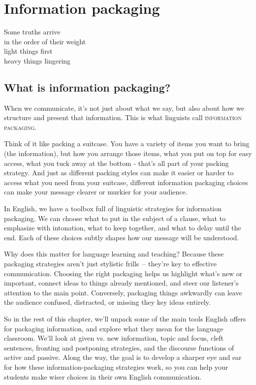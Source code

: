 \chapter{Information packaging} \label{ch:info-package}

\epigraph{Some truths arrive\\
in the order of their weight\\
light things first\\
heavy things lingering}{}

\section{What is information packaging?}

When we communicate, it's not just about what we say, but also about how we structure and present that information. This is what linguists call \textsc{information packaging}.

Think of it like packing a suitcase. You have a variety of items you want to bring (the information), but how you arrange those items, what you put on top for easy access, what you tuck away at the bottom - that's all part of your packing strategy. And just as different packing styles can make it easier or harder to access what you need from your suitcase, different information packaging choices can make your message clearer or murkier for your audience.

In English, we have a toolbox full of linguistic strategies for information packaging. We can choose what to put in the subject of a clause, what to emphasize with intonation, what to keep together, and what to delay until the end. Each of these choices subtly shapes how our message will be understood.

Why does this matter for language learning and teaching? Because these packaging strategies aren't just stylistic frills~-- they're key to effective communication. Choosing the right packaging helps us highlight what's new or important, connect ideas to things already mentioned, and steer our listener's attention to the main point. Conversely, packaging things awkwardly can leave the audience confused, distracted, or missing they key ideas entirely.

So in the rest of this chapter, we'll unpack some of the main tools English offers for packaging information, and explore what they mean for the language classroom. We'll look at given vs. new information, topic and focus, cleft sentences, fronting and postponing strategies, and the discourse functions of active and passive. Along the way, the goal is to develop a sharper eye and ear for how these information-packaging strategies work, so you can help your students make wiser choices in their own English communication.

